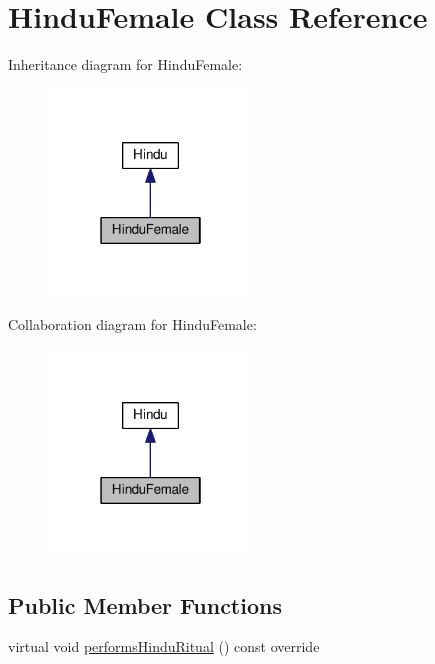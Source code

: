 \hypertarget{classHinduFemale}{}\section{Hindu\+Female Class Reference}
\label{classHinduFemale}


Inheritance diagram for Hindu\+Female\+:
\nopagebreak
\begin{figure}[H]
\begin{center}
\leavevmode
\includegraphics[width=154pt]{classHinduFemale__inherit__graph}
\end{center}
\end{figure}


Collaboration diagram for Hindu\+Female\+:
\nopagebreak
\begin{figure}[H]
\begin{center}
\leavevmode
\includegraphics[width=154pt]{classHinduFemale__coll__graph}
\end{center}
\end{figure}
\subsection*{Public Member Functions}
\begin{DoxyCompactItemize}
\item 
virtual void \hyperlink{classHinduFemale_a7e5f4948f123a1a5e82f29f61e842c14}{performs\+Hindu\+Ritual} () const override
\end{DoxyCompactItemize}


